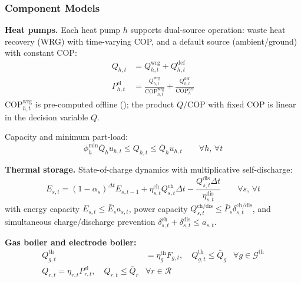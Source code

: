 \documentclass[review,3p]{elsarticle}
\begin{document}
\subsubsection{Component Models}
\label{sec:model_components}

\textbf{Heat pumps.}
\label{sec:model_hp}
Each heat pump $h$ supports dual-source operation: waste heat
recovery (WRG) with time-varying COP, and a default source
(ambient/ground) with constant COP:
\begin{align}
Q_{h,t} &= Q_{h,t}^{\mathrm{wrg}} + Q_{h,t}^{\mathrm{def}}
\label{eq:hp_split} \\
P_{h,t}^{\mathrm{el}} &= \frac{Q_{h,t}^{\mathrm{wrg}}}{
\mathrm{COP}_{h,t}^{\mathrm{wrg}}}
+ \frac{Q_{h,t}^{\mathrm{def}}}{\mathrm{COP}_h^{\mathrm{def}}}
\label{eq:hp_pel}
\end{align}
$\mathrm{COP}_{h,t}^{\mathrm{wrg}}$ is pre-computed offline
(); the product $Q/\mathrm{COP}$ with fixed COP is
linear in the decision variable $Q$.

Capacity and minimum part-load:
\begin{equation}
\phi_h^{\mathrm{min}} \bar{Q}_h u_{h,t} \leq Q_{h,t}
\leq \bar{Q}_h u_{h,t}
\qquad \forall h,\, \forall t
\label{eq:hp_cap}
\end{equation}

\textbf{Thermal storage.} State-of-charge dynamics with
multiplicative self-discharge:
\begin{equation}
E_{s,t} = (1-\alpha_s)^{\Delta t} E_{s,t-1}
+ \eta_{s,t}^{\mathrm{ch}} Q_{s,t}^{\mathrm{ch}} \Delta t
- \frac{Q_{s,t}^{\mathrm{dis}} \Delta t}{\eta_{s,t}^{\mathrm{dis}}}
\qquad \forall s,\, \forall t
\label{eq:storage_soc}
\end{equation}
with energy capacity $E_{s,t} \leq \bar{E}_s a_{s,t}$, power
capacity $Q_{s,t}^{\mathrm{ch/dis}} \leq \bar{P}_s
\delta_{s,t}^{\mathrm{ch/dis}}$, and simultaneous
charge/discharge prevention
$\delta_{s,t}^{\mathrm{ch}} + \delta_{s,t}^{\mathrm{dis}}
\leq a_{s,t}$.

\textbf{Gas boiler and electrode boiler:}
\begin{align}
Q_{g,t}^{\mathrm{th}} &= \eta_g^{\mathrm{th}} F_{g,t},
\quad Q_{g,t}^{\mathrm{th}} \leq \bar{Q}_g
& \forall g \in \mathcal{G}^{\mathrm{th}}
\label{eq:gen_thermal} \\
Q_{r,t} = \eta_{r,t} P_{r,t}^{\mathrm{el}},
\quad Q_{r,t} \leq \bar{Q}_r
& \forall r \in \mathcal{R}
\label{eq:p2h}
\end{align}
\end{document}
